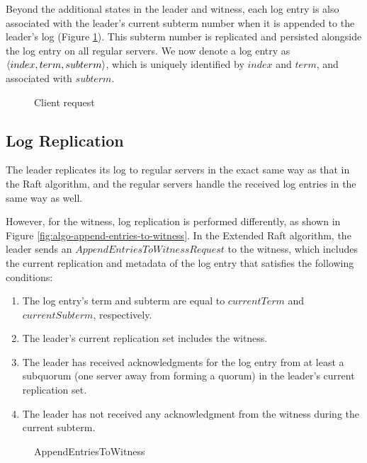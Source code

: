 Beyond the additional states in the leader and witness, each log entry is also associated with the leader's current subterm number when it is appended to the leader's log (Figure \ref{fig:client-request}). This subterm number is replicated and persisted alongside the log entry on all regular servers. We now denote a log entry as $\langle index,term,subterm \rangle$, which is uniquely identified by $index$ and $term$, and associated with $subterm$.

\begin{figure}
    \begin{framed}
        
    \end{framed}
    \caption{Client request}
    \label{fig:client-request}
\end{figure}

\subsection{Log Replication} \label{subsection:log-replication}
The leader replicates its log to regular servers in the exact same way as that in the Raft algorithm, and the regular servers handle the received log entries in the same way as well.

However, for the witness, log replication is performed differently, as shown in Figure \ref{fig:algo-append-entries-to-witness}. In the Extended Raft algorithm, the leader sends an $AppendEntriesToWitnessRequest$ to the witness, which includes the current replication and metadata of the log entry that satisfies the following conditions:
\begin{enumerate} 
    \item\label{cond:in-subterm} The log entry's term and subterm are equal to $currentTerm$ and $currentSubterm$, respectively. 
    \item The leader's current replication set includes the witness. 
    \item The leader has received acknowledgments for the log entry from at least a subquorum (one server away from forming a quorum) in the leader's current replication set. 
    \item\label{condition:first-in-subterm} The leader has not received any acknowledgment from the witness during the current subterm. 
\end{enumerate}

\begin{figure}[htbp]
    \begin{framed}
        
    \end{framed}
    
    \caption{AppendEntriesToWitness}
    \label{fig:append-entries-to-witness}
\end{figure}

